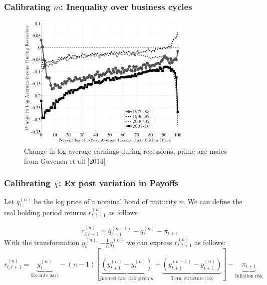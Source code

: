 \documentclass{beamer}
\begin{document}
\begin{frame}	
\frametitle{Calibrating $m$: Inequality over business cycles}


 {
  \begin{figure}
  \label{fig:fatih_picture}
    \centering
    \includegraphics[width = 0.75\textwidth]{fg13.jpeg}
    \caption{ Change in log average earnings during recessions, prime-age males from Guvenen et all [2014]}
  \end{figure}

}
\end{frame}



\begin{frame}
 \frametitle{Calibrating $\chi$: Ex post variation in Payoffs}
 Let $q^{(n)}_t$ be the log price of a nominal bond of maturity $n$. We can define the real holding period returns $r^{(n)}_{t,t+1}$ as follows
 
 \[r^{(n)}_{t,t+1}= q^{(n-1)}_{t+1}-q_t^{(n)}-\pi_{t+1}\]
 With the transformation $y^{(n)}_t: -\frac{1}{n} q^{(n)}_t$ we can express $r^{(n)}_{t,t+1}$ as follows:
 \small
 \[r^{(n)}_{t,t+1}=\underbrace{y^{(n)}_t}_{\text{Ex-ante part}} - (n-1)\left[\underbrace{\left(y^{(n)}_{t+1}-y^{(n)}_{t}\right)}_{\text{Interest rate risk given $n$}}+\underbrace{\left(y^{(n-1)}_{t+1}-y^{(n)}_{t+1}\right)}_{\text{Term structure risk}}\right]-\underbrace{\pi_{t+1}}_{\text{Inflation risk}}\]
\end{frame}
\end{document}
